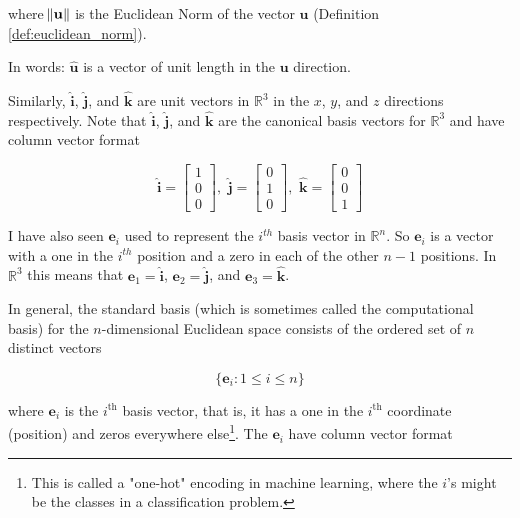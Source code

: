 \documentclass{article}
\theoremstyle{definition}
\begin{document}
\bigskip
\noindent
where $\norm{\mathbf{u}}$ is the Euclidean Norm
of the vector $\mathbf{u}$ (Definition \ref{def:euclidean_norm}).

\bigskip
\noindent
In words: $\hat{\mathbf{u}}$ is a vector of unit
length in the $\mathbf{u}$ direction. 

\bigskip
\noindent
Similarly, $\mathbf{\hat{i}}$, $\mathbf{\hat{j}}$, and
$\mathbf{\hat{k}}$ are unit vectors in $\mathbb{R}^3$ in the $x$,
$y$, and $z$ directions respectively. Note that
$\mathbf{\hat{i}}$, $\mathbf{\hat{j}}$, and $\mathbf{\hat{k}}$
are the canonical basis vectors for $\mathbb{R}^3$
\cite{notes:basis} and have column vector format

\bigskip
\begin{equation*}
{\displaystyle \mathbf {\hat {i}} 
= {\begin{bmatrix}1\\0\\0\end{bmatrix}},\,\,
\mathbf {\hat {j}} = {\begin{bmatrix}0\\1\\0\end{bmatrix}},\,\,
\mathbf {\hat {k}} = {\begin{bmatrix}0\\0\\1\end{bmatrix}}}
\end{equation*}

\medskip
\bigskip
\noindent
I have also seen $\mathbf{e}_i$ used to represent the $i^{th}$
basis vector in $\mathbb{R}^n$. So $\mathbf{e}_i$ is a vector
with a one in the $i^{th}$ position and a zero in each of the
other $n - 1$ positions.  In $\mathbb{R}^3$ this means that
$\mathbf{e}_1 = \mathbf{\hat{i}}$, $\mathbf{e}_2 =
\mathbf{\hat{j}}$, and $\mathbf{e}_3 = \mathbf{\hat{k}}$.


\bigskip
\noindent
In general, the standard basis (which is sometimes called the
computational basis) for the $n$-dimensional Euclidean space
consists of the ordered set of $n$ distinct vectors

\medskip
\begin{equation*}
\{\mathbf {e} _{i}: 1 \leq i \leq n\}
\end{equation*}

\bigskip
\noindent
where $\mathbf{e}_i$ is the $i^\text{th}$ basis vector, that is,
it has a one in the $i^\text{th}$ coordinate (position) and zeros
everywhere else\footnote{This is called a "one-hot"
encoding in machine learning, where the $i$'s might be
the classes in a classification problem.}. The $\mathbf{e}_i$ have
column vector format
\end{document}
